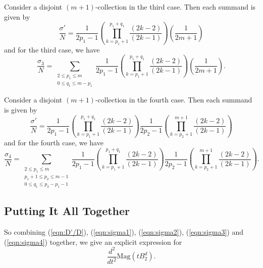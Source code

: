 \documentclass[11pt]{article}
\theoremstyle{mythm}
\begin{document}
Consider a disjoint $(m+1)$-collection in the third case. Then each summand is given by
\begin{equation*}
\frac{\sigma'}{N} = \frac{1}{2p_1-1}\left(\prod\limits_{k=p_1+1}^{p_1+q_1}\frac{(2k-2)}{(2k-1)}\right)\left(\frac{1}{2m+1}\right)
\end{equation*}
and for the third case, we have
\begin{equation}\label{eqn:sigma3}
\frac{\sigma_3}{N} = \sum\limits_{\substack{2\leq p_1\leq m \\ 0\leq q_1\leq m-p_1}}\frac{1}{2p_1-1}\left(\prod\limits_{k=p_1+1}^{p_1+q_1}\frac{(2k-2)}{(2k-1)}\right)\left(\frac{1}{2m+1}\right).
\end{equation}

Consider a disjoint $(m+1)$-collection in the fourth case. Then each summand is given by
\begin{equation*}
\frac{\sigma'}{N} = \frac{1}{2p_1-1}\left(\prod\limits_{k=p_1+1}^{p_1+q_1}\frac{(2k-2)}{(2k-1)}\right)\frac{1}{2p_2-1}\left(\prod\limits_{k=p_2+1}^{m+1}\frac{(2k-2)}{(2k-1)}\right)
\end{equation*}
and for the fourth case, we have
\begin{equation}\label{eqn:sigma4}
\frac{\sigma_4}{N} = \sum\limits_{\substack{2\leq p_1\leq m \\ p_1+1\leq p_2 \leq m-1 \\ 0\leq q_1\leq p_2-p_1-1 }}\frac{1}{2p_1-1}\left(\prod\limits_{k=p_1+1}^{p_1+q_1}\frac{(2k-2)}{(2k-1)}\right)\frac{1}{2p_2-1}\left(\prod\limits_{k=p_2+1}^{m+1}\frac{(2k-2)}{(2k-1)}\right).
\end{equation}

\subsection{Putting It All Together}

So combining (\ref{eqn:D'/D}), (\ref{eqn:sigma1}), (\ref{eqn:sigma2}), (\ref{eqn:sigma3}) and (\ref{eqn:sigma4}) together, we give an explicit expression for
\begin{equation*}
\frac{d^2}{dt^2}\text{Mag}\left(tB_2^d\right).
\end{equation*}
\end{document}

